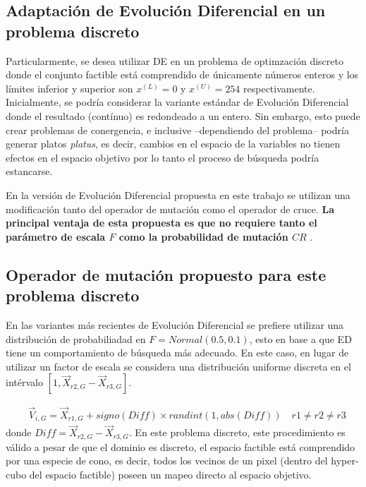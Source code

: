 \documentclass[preprint,12pt]{elsarticle}
\begin{document}
\subsection{Adaptación de Evolución Diferencial en un problema discreto}
Particularmente, se desea utilizar DE en un problema de optimzación discreto donde el conjunto factible está comprendido de  únicamente números enteros y los límites inferior y superior  son $x^{(L)}=0$ y $x^{(U)}=254$ respectivamente.
%
Inicialmente, se podría considerar la variante estándar de Evolución Diferencial donde el resultado (contínuo) es redondeado a un entero.
%
Sin embargo, esto puede crear problemas de conergencia, e inclusive --dependiendo del problema-- podría generar platos \textit{platus}, es decir, cambios en el espacio de la variables no tienen efectos en el espacio objetivo por lo tanto el proceso de búsqueda podría estancarse.
%

En la versión de Evolución Diferencial propuesta en este trabajo se utilizan una modificación tanto del operador de mutación como el operador de cruce.
%
\textbf{La principal ventaja de esta propuesta es que no requiere tanto el parámetro de escala $F$ como la probabilidad de mutación $CR$ }.
%

\subsection{Operador de mutación propuesto para este problema discreto}

En las variantes más recientes de Evolución Diferencial se prefiere utilizar una distribución de probabiliadad en $F=Normal(0.5, 0.1)$, esto en base a que ED tiene un comportamiento de búsqueda más adecuado.
%
En este caso, en lugar de utilizar un factor de escala se considera una distribución uniforme discreta en el intérvalo $[1, \vec{X}_{r2, G} - \vec{X}_{r3, G}]$.

\begin{equation}
\begin{split}
&\vec{V}_{i,G} = \vec{X}_{r1, G} +  signo(Diff) \times randint( 1, abs(Diff)) \quad r1 \neq r2 \neq r3   
\end{split}
\end{equation}
donde $Diff = \vec{X}_{r2, G} - \vec{X}_{r3, G}$.
%
En este problema discreto, este procedimiento es válido a pesar de que el dominio es discreto, el espacio factible está comprendido por una especie de cono, es decir, todos los vecinos de un pixel (dentro del hyper-cubo del espacio factible) poseen un mapeo directo al espacio objetivo.
\end{document}

